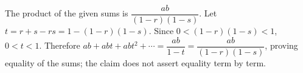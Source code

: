 The product of the given sums is $\dfrac{ab}{(1-r)(1-s)}$. Let $t=r+s-rs=1-(1-r)(1-s)$. Since $0<(1-r)(1-s)<1$, $0<t<1$. Therefore $ab+abt+abt^2+\cdots=\dfrac{ab}{1-t}=\dfrac{ab}{(1-r)(1-s)}$, proving equality of the sums; the claim does not assert equality term by term.
